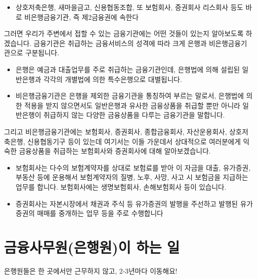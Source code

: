 \documentclass[
]{book}
\providecommand{\tightlist}{%
  \setlength{\itemsep}{0pt}\setlength{\parskip}{0pt}}
\begin{document}
\begin{itemize}
\tightlist
\item
  상호저축은행, 새마을금고, 신용협동조합, 또 보험회사, 증권회사 리스회사 등도 바로 비은행금융기관, 즉 제2금융권에 속한다
\end{itemize}

그러면 우리가 주변에서 접할 수 있는 금융기관에는 어떤 것들이 있는지 알아보도록 하겠습니다. 금융기관은 취급하는 금융서비스의 성격에 따라 크게 은행과 비은행금융기관으로 구분됩니다.

\begin{itemize}
\tightlist
\item
  은행은 예금과 대출업무를 주로 취급하는 금융기관인데, 은행법에 의해 설립된 일반은행과 각각의 개별법에 의한 특수은행으로 대별됩니다.\\
\item
  비은행금융기관은 은행을 제외한 금융기관을 통칭하여 부르는 말로서, 은행법에 의한 적용을 받지 않으면서도 일반은행과 유사한 금융상품을 취급할 뿐만 아니라 일반은행이 취급하지 않는 다양한 금융상품을 다루는 금융기관을 말합니다.
\end{itemize}

그리고 비은행금융기관에는 보험회사, 증권회사, 종합금융회사, 자산운용회사, 상호저축은행, 신용협동기구 등이 있는데 여기서는 이들 가운데서 상대적으로 여러분에게 익숙한 금융상품을 취급하는 보험회사와 증권회사에 대해 알아보겠습니다.

\begin{itemize}
\tightlist
\item
  보험회사는 다수의 보험계약자를 상대로 보험료를 받아 이 자금을 대출, 유가증권, 부동산 등에 운용해서 보험계약자의 질병, 노후, 사망, 사고 시 보험금을 지급하는 업무를 합니다. 보험회사에는 생명보험회사, 손해보험회사 등이 있습니다.\\
\item
  증권회사는 자본시장에서 채권과 주식 등 유가증권의 발행을 주선하고 발행된 유가증권의 매매를 중개하는 업무 등을 주로 수행합니다
\end{itemize}

\hypertarget{uxae08uxc735uxc0acuxbb34uxc6d0uxc740uxd589uxc6d0uxc774-uxd558uxb294-uxc77c}{%
\section{금융사무원(은행원)이 하는 일}\label{uxae08uxc735uxc0acuxbb34uxc6d0uxc740uxd589uxc6d0uxc774-uxd558uxb294-uxc77c}}

은행원들은 한 곳에서만 근무하지 않고,
2-3년마다 이동해요!
\end{document}
